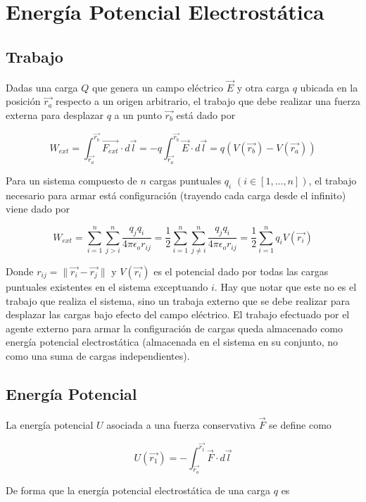 \section{Energía Potencial Electrostática}

\subsection{Trabajo}

Dadas una carga $Q$ que genera un campo eléctrico $\Vec{E}$ y otra carga $q$ ubicada en la posición $\Vec{r_a}$ respecto a un origen arbitrario, el trabajo que debe realizar una fuerza externa para desplazar $q$ a un punto $\Vec{r_b}$ está dado por

\[W_{ext} = \int^{\Vec{r_b}}_{\Vec{r_a}}\Vec{F_{ext}}\cdot d\Vec{l}
= -q\int^{\Vec{r_b}}_{\Vec{r_a}}\Vec{E}\cdot d\Vec{l}
= q(V(\Vec{r_b})-V(\Vec{r_a}))
\]

Para un sistema compuesto de $n$ cargas puntuales $q_i$ $(i \in [1,...,n])$, el trabajo necesario para armar está configuración (trayendo cada carga desde el infinito) viene dado por

\[W_{ext} = \sum_{i=1}^n\sum_{j>i}^n\frac{q_jq_i}{4\pi\epsilon_o r_{ij}}
= \frac{1}{2}\sum_{i=1}^n\sum_{j\neq i}^n\frac{q_jq_i}{4\pi\epsilon_o r_{ij}}
= \frac{1}{2}\sum_{i=1}^nq_iV(\Vec{r_i})\]

Donde $r_{ij} = \parallel\Vec{r_i}-\Vec{r_j}\parallel$ y $V(\Vec{r_i})$ es el potencial dado por todas las cargas puntuales existentes en el sistema exceptuando $i$.
\medbreak
Hay que notar que este no es el trabajo que realiza el sistema, sino un trabaja externo que se debe realizar para desplazar las cargas bajo efecto del campo eléctrico.
\medbreak
El trabajo efectuado por el agente externo para armar la configuración de cargas queda almacenado como energía potencial electrostática (almacenada en el sistema en su conjunto, no como una suma de cargas independientes).

\subsection{Energía Potencial}

La energía potencial $U$ asociada a una fuerza conservativa $\Vec{F}$ se define como

\[U (\Vec{r_1})= -\int^{\Vec{r_1}}_{\Vec{r_o}}\Vec{F}\cdot d\Vec{l}\]

De forma que la energía potencial electrostática de una carga $q$ es

